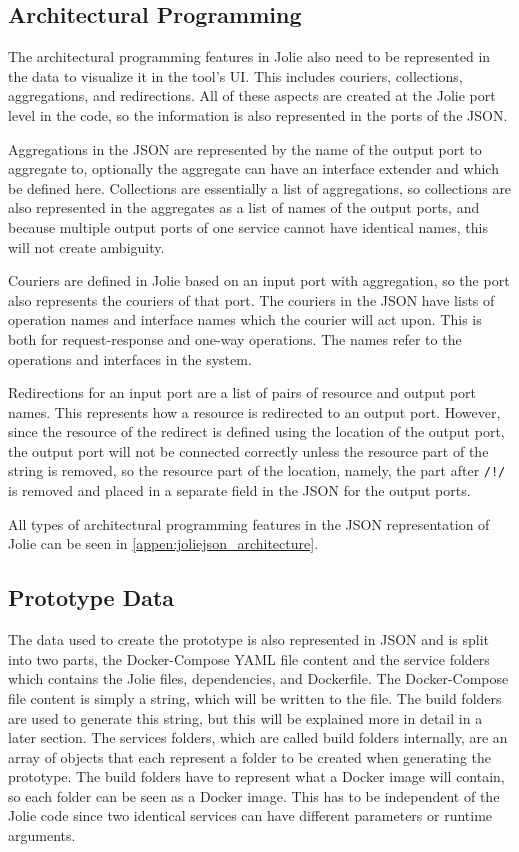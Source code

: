 \subsection{Architectural Programming}
The architectural programming features in Jolie also need to be represented in the data to visualize it in the tool's UI.
This includes couriers, collections, aggregations, and redirections. All of these aspects are created at the Jolie port level in the code, so the information is also represented in the ports of the JSON.

Aggregations in the JSON are represented by the name of the output port to aggregate to, optionally the aggregate can have an interface extender and which be defined here.
Collections are essentially a list of aggregations, so collections are also represented in the aggregates as a list of names of the output ports, and because multiple output ports of one service cannot have identical names, this will not create ambiguity.

Couriers are defined in Jolie based on an input port with aggregation, so the port also represents the couriers of that port.
The couriers in the JSON have lists of operation names and interface names which the courier will act upon. This is both for request-response and one-way operations. The names refer to the operations and interfaces in the system.

Redirections for an input port are a list of pairs of resource and output port names. This represents how a resource is redirected to an output port.
However, since the resource of the redirect is defined using the location of the output port, the output port will not be connected correctly unless the resource part of the string is removed, so the resource part of the location, namely,
the part after \texttt{/!/} is removed and placed in a separate field in the JSON for the output ports.

All types of architectural programming features in the JSON representation of Jolie can be seen in \cref{appen:joliejson_architecture}.

\subsection{Prototype Data}
The data used to create the prototype is also represented in JSON and is split into two parts, the Docker-Compose YAML file content and the service folders which contains the Jolie files, dependencies, and Dockerfile.
The Docker-Compose file content is simply a string, which will be written to the file. The build folders are used to generate this string, but this will be explained more in detail in a later section.
The services folders, which are called build folders internally, are an array of objects that each represent a folder to be created when generating the prototype.
The build folders have to represent what a Docker image will contain, so each folder can be seen as a Docker image. This has to be independent of the Jolie code since two identical services can have different parameters or runtime arguments.

